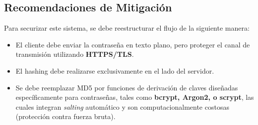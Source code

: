 \documentclass[12pt,a4paper]{article}
\begin{document}
\subsection{Recomendaciones de Mitigación}
Para securizar este sistema, se debe reestructurar el flujo de la siguiente manera:
\begin{itemize}
    \item El cliente debe enviar la contraseña en texto plano, pero proteger el canal de transmisión utilizando \textbf{HTTPS/TLS}.
    \item El hashing debe realizarse exclusivamente en el lado del servidor.
    \item Se debe reemplazar MD5 por funciones de derivación de claves diseñadas específicamente para contraseñas, tales como \textbf{bcrypt, Argon2, o scrypt}, las cuales integran \textit{salting} automático y son computacionalmente costosas (protección contra fuerza bruta).
\end{itemize}
\end{document}
